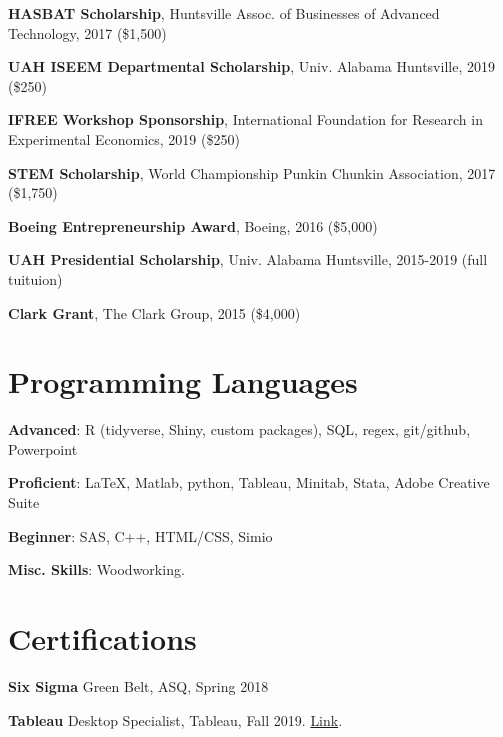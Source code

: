 \documentclass[margin,line]{res}
\begin{document}
\begin{resume}
{\bf HASBAT Scholarship}, Huntsville Assoc. of Businesses of Advanced Technology, 2017 (\$1,500)
\vspace*{-3.5mm}

{\bf UAH ISEEM Departmental Scholarship}, Univ. Alabama Huntsville, 2019 (\$250)
\vspace*{-3.5mm}

{\bf IFREE Workshop Sponsorship}, International Foundation for Research in Experimental Economics, 2019 (\$250)
\vspace*{-3.5mm}

{\bf STEM Scholarship}, World Championship Punkin Chunkin Association, 2017 (\$1,750)
\vspace*{-3.5mm}

{\bf Boeing Entrepreneurship Award}, Boeing, 2016 (\$5,000)
\vspace*{-3.5mm}

{\bf UAH Presidential Scholarship}, Univ. Alabama Huntsville, 2015-2019 (full tuituion)
\vspace*{-3.5mm}

{\bf Clark Grant}, The Clark Group, 2015 (\$4,000)
\vspace*{-3.5mm}




\vspace{.75cm}
\section{\sc Programming Languages} 
{\bf Advanced}:  R (tidyverse, Shiny, custom packages), SQL, regex, git/github, Powerpoint
\vspace*{-3mm}

{\bf Proficient}:  \LaTeX, Matlab, python, Tableau, Minitab, Stata, Adobe Creative Suite
\vspace*{-3mm}

{\bf Beginner}:  SAS, C++, HTML/CSS, Simio
\vspace*{-3mm}

{\bf Misc. Skills}: Woodworking. 

\vspace{.75cm}
\section{\sc Certifications}
{\bf Six Sigma} Green Belt, ASQ, Spring 2018
\vspace*{-3mm}

{\bf Tableau} Desktop Specialist, Tableau, Fall 2019. \href{https://www.credly.com/badges/e9a605a8-1977-4a1c-ab24-149a37c7fb36/linked_in_profile}{Link}.
\vspace*{-3mm}


\end{resume}
\end{document}
